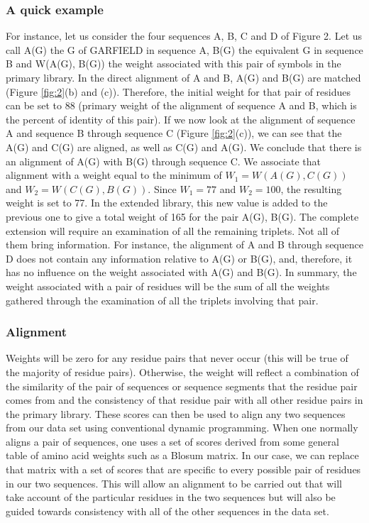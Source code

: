 \subsubsection{A quick example}
For instance, let us consider the four sequences A, B, C
and D of Figure 2. Let us call A(G) the G of GARFIELD in sequence A, B(G) the equivalent G in sequence B and W(A(G), B(G)) the weight associated with this pair of symbols in the primary library. In the direct alignment of A and B, A(G) and B(G) are matched (Figure \ref{fig:2}(b) and (c)). Therefore, the initial weight for that pair of residues can be set to 88 (primary weight of the alignment of sequence A and B, which is the percent of identity of this pair). If we now look at the alignment of sequence A and sequence B through sequence C (Figure \ref{fig:2}(c)), we can see that the A(G) and C(G) are aligned, as well as C(G) and A(G). We conclude that there is an alignment of A(G) with B(G) through sequence C. We associate that alignment with a weight equal to the minimum of $W_1 = W(A(G), C(G))$ and $W_2 = W(C(G), B(G))$. Since $W_1 = 77$ and $W_2 = 100$, the resulting weight is set to 77. In the extended library, this new value is added to the previous one to give a total weight of 165 for the pair A(G), B(G). The complete extension will require an examination of all the remaining triplets. Not all of them bring information. For instance, the alignment of A and B through sequence D does not contain any information relative to A(G) or B(G), and, therefore, it has no influence on the weight associated with A(G) and B(G). In summary, the weight associated with a pair of residues will be the sum of all the weights gathered through the examination of all the triplets involving that pair.

\subsubsection{Alignment}
Weights will be zero for any residue pairs that never occur (this will be true of the majority of residue pairs). Otherwise, the weight will reflect a
combination of the similarity of the pair of sequences or sequence segments that the residue pair comes from and the consistency of that residue pair with all other residue pairs in the primary library. These scores can then be used to align any two sequences from our data set using conventional dynamic programming.
When one normally aligns a pair of sequences, one uses a set of scores derived from some general table of amino acid weights such as a Blosum matrix. In our case, we can replace that matrix with a set of scores that are specific to every possible pair of residues in our two sequences.
This will allow an alignment to be carried out that will take account of the particular residues in the two sequences but will also be guided towards consistency with all of the other sequences in the data set.

